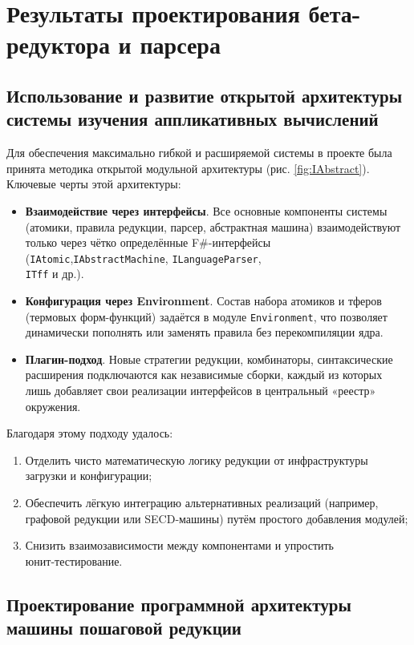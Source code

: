 \chapter{Результаты проектирования бета-редуктора и парсера}
\label{chapter3}

\section{Использование и развитие открытой архитектуры системы изучения аппликативных вычислений}
\label{sec:open-architecture}

Для обеспечения максимально гибкой и расширяемой системы в проекте была принята методика открытой модульной архитектуры (рис. \ref{fig:IAbstract}).  
Ключевые черты этой архитектуры:
\begin{itemize}
  \item \textbf{Взаимодействие через интерфейсы}. Все основные компоненты системы (атомики, правила редукции, парсер, абстрактная машина) взаимодействуют только через чётко определённые F\#-интерфейсы (\texttt{IAtomic},\texttt{IAbstractMachine}, \texttt{ILanguageParser},\\\texttt{ITff}  и др.).
  \item \textbf{Конфигурация через Environment}. Состав набора атомиков и тферов (термовых форм-функций) задаётся в модуле \texttt{Environment}, что позволяет динамически пополнять или заменять правила без перекомпиляции ядра.
  \item \textbf{Плагин-подход}. Новые стратегии редукции, комбинаторы, синтаксические расширения подключаются как независимые сборки, каждый из которых лишь добавляет свои реализации интерфейсов в центральный «реестр» окружения.
\end{itemize}

Благодаря этому подходу удалось:
\begin{enumerate}
  \item Отделить чисто математическую логику редукции от инфраструктуры загрузки и конфигурации;
  \item Обеспечить лёгкую интеграцию альтернативных реализаций (например, графовой редукции или SECD‑машины) путём простого добавления модулей;
  \item Снизить взаимозависимости между компонентами и упростить юнит‑тестирование.
\end{enumerate}

\section{Проектирование программной архитектуры машины пошаговой редукции}
\label{sec:beta-reductor-api}

